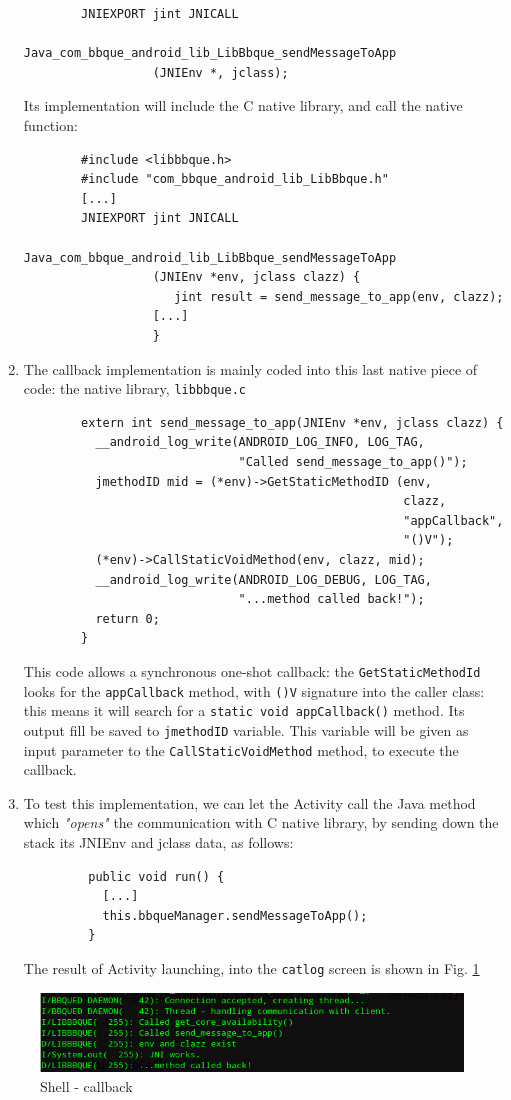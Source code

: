 \begin{enumerate}
\begin{verbatim}
		JNIEXPORT jint JNICALL
		          Java_com_bbque_android_lib_LibBbque_sendMessageToApp
		          (JNIEnv *, jclass);
	\end{verbatim}
	Its implementation will include the C native library, and call the native function:
	\begin{verbatim}
		#include <libbbque.h>
		#include "com_bbque_android_lib_LibBbque.h"
		[...]
		JNIEXPORT jint JNICALL
		          Java_com_bbque_android_lib_LibBbque_sendMessageToApp
		          (JNIEnv *env, jclass clazz) {
		             jint result = send_message_to_app(env, clazz);
		          [...]
		          }
	\end{verbatim}
	\item The callback implementation is mainly coded into this last native piece of code: the native library, \texttt{libbbque.c}
	\begin{verbatim}
		extern int send_message_to_app(JNIEnv *env, jclass clazz) {
		  __android_log_write(ANDROID_LOG_INFO, LOG_TAG,
		                      "Called send_message_to_app()");
		  jmethodID mid = (*env)->GetStaticMethodID (env, 
		                                             clazz,
		                                             "appCallback",
		                                             "()V");
		  (*env)->CallStaticVoidMethod(env, clazz, mid);
		  __android_log_write(ANDROID_LOG_DEBUG, LOG_TAG,
		                      "...method called back!");	
		  return 0;
		}
	\end{verbatim}
	This code allows a synchronous one-shot callback: the \texttt{GetStaticMethodId} looks for the \texttt{appCallback} method, with \texttt{()V} signature into the caller class: this means it will search for a \texttt{static void appCallback()} method. Its output fill be saved to \texttt{jmethodID} variable. This variable will be given as input parameter to the \texttt{CallStaticVoidMethod} method, to execute the callback.
	\item To test this implementation, we can let the Activity call the Java method which \textit{"opens"} the communication with C native library, by sending down the stack its JNIEnv and jclass data, as follows:
	\begin{verbatim}
		 public void run() {
		   [...]
		   this.bbqueManager.sendMessageToApp();
		 }
	\end{verbatim}
	The result of Activity launching, into the \texttt{catlog} screen is shown in Fig. \ref{fig:shell2}
\end{enumerate}
\begin{figure}[!htb]
	\centering
	\includegraphics[scale=.505]{images/shell2.png}
	\caption{Shell - callback}
	\label{fig:shell2}
\end{figure}
